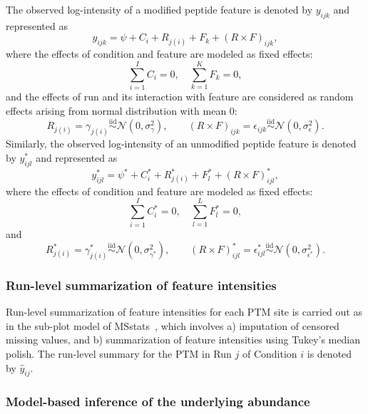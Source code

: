 \documentclass{mcp}
\begin{document}
The observed log-intensity of a modified peptide feature is denoted by $y_{ijk}$ and represented as
\[
y_{ijk} = \psi + C_{i} + R_{j(i)} + F_{k} + (R \times F)_{ijk},
\]
where the effects of condition and feature are modeled as fixed effects: 
\[
\sum_{i=1}^{I} C_{i} = 0, \quad \sum_{k=1}^{K} F_{k} = 0,
\]
and the effects of run and its interaction with feature are considered as random effects arising from normal distribution with mean $0$: 
\[
R_{j(i)} = \gamma_{j(i)} \stackrel{\text{iid}}{\sim} \mathcal{N}(0, \sigma_{\gamma}^{2}), \qquad
(R \times F)_{ijk} = \epsilon_{ijk} \stackrel{\text{iid}}{\sim} \mathcal{N}(0, \sigma_{\epsilon}^{2}).
\]
Similarly, the observed log-intensity of an unmodified peptide feature is denoted by $y_{ijl}^{\ast}$ and represented as 
\[
y_{ijl}^{\ast} = \psi^{\ast} + C_{i}^{\ast} + R_{j(i)}^{\ast} + F_{l}^{\ast} + (R \times F)_{ijl}^{\ast}, 
\]
where the effects of condition and feature are modeled as fixed effects: 
\[
\sum_{i=1}^{I} C_{i}^{\ast} = 0, \quad \sum_{l=1}^{L} F_{l}^{\ast} = 0,
\]
and 
\[
R_{j(i)}^{\ast} = \gamma_{j(i)}^{\ast} \stackrel{\text{iid}}{\sim} \mathcal{N}(0, \sigma_{\gamma^{\ast}}^{2}), \qquad
(R \times F)_{ijl}^{\ast} = \epsilon_{ijl}^{\ast} \stackrel{\text{iid}}{\sim} \mathcal{N}(0, \sigma_{\epsilon^{\ast}}^{2}).
\]


\subsubsection{Run-level summarization of feature intensities}
\label{sec:sum}

Run-level summarization of feature intensities for each PTM site is carried out as in the sub-plot model of MSstats~\cite{choi_etal_14a}, which involves a) imputation of censored missing values, and b) summarization of feature intensities using Tukey's median polish. The run-level summary for the PTM in Run $j$ of Condition $i$ is denoted by $\hat{y}_{ij}$.


\subsubsection{Model-based inference of the underlying abundance}
\label{sec:infer}
\end{document}
